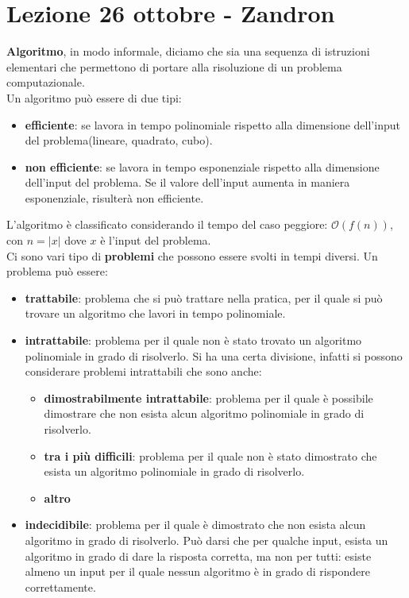 \section{Lezione 26 ottobre - Zandron}
\textbf{Algoritmo}, in modo informale, diciamo che sia una sequenza di istruzioni elementari che permettono di portare alla risoluzione di un problema computazionale. \\
Un algoritmo può essere di due tipi:
\begin{itemize}
\itemsep1pt\parskip0pt
    \item \textbf{efficiente}: se lavora in tempo polinomiale rispetto alla dimensione dell'input del problema(lineare, quadrato, cubo).
    \item \textbf{non efficiente}: se lavora in tempo esponenziale rispetto alla dimensione dell'input del problema. Se il valore dell'input aumenta in maniera esponenziale, risulterà non efficiente.
\end{itemize}
L'algoritmo è classificato considerando il tempo del caso peggiore: $\mathcal{O}(f(n))$, con $n=|x|$ dove $x$ è l'input del problema.\\

Ci sono vari tipo di \textbf{problemi} che possono essere svolti in tempi diversi. Un problema può essere:
\begin{itemize}
    \itemsep1pt\parskip0pt
    \item \textbf{trattabile}: problema che si può trattare nella pratica, per il quale si può trovare un algoritmo che lavori in tempo polinomiale.
    \item \textbf{intrattabile}: problema per il quale non è stato trovato un algoritmo polinomiale in grado di risolverlo. Si ha una certa divisione, infatti si possono considerare problemi intrattabili che sono anche:
        \begin{itemize}
            \item \textbf{dimostrabilmente intrattabile}: problema per il quale è possibile dimostrare che non esista alcun algoritmo polinomiale in grado di risolverlo.
        \item \textbf{tra i più difficili}: problema per il quale non è stato dimostrato che esista un algoritmo polinomiale in grado di risolverlo.
        \item \textbf{altro}
        \end{itemize}
    \item \textbf{indecidibile}: problema per il quale è dimostrato che non esista alcun algoritmo in grado di risolverlo. Può darsi che per qualche input, esista un algoritmo in grado di dare la risposta corretta, ma non per tutti: esiste almeno un input per il quale nessun algoritmo è in grado di rispondere correttamente.
\end{itemize}

